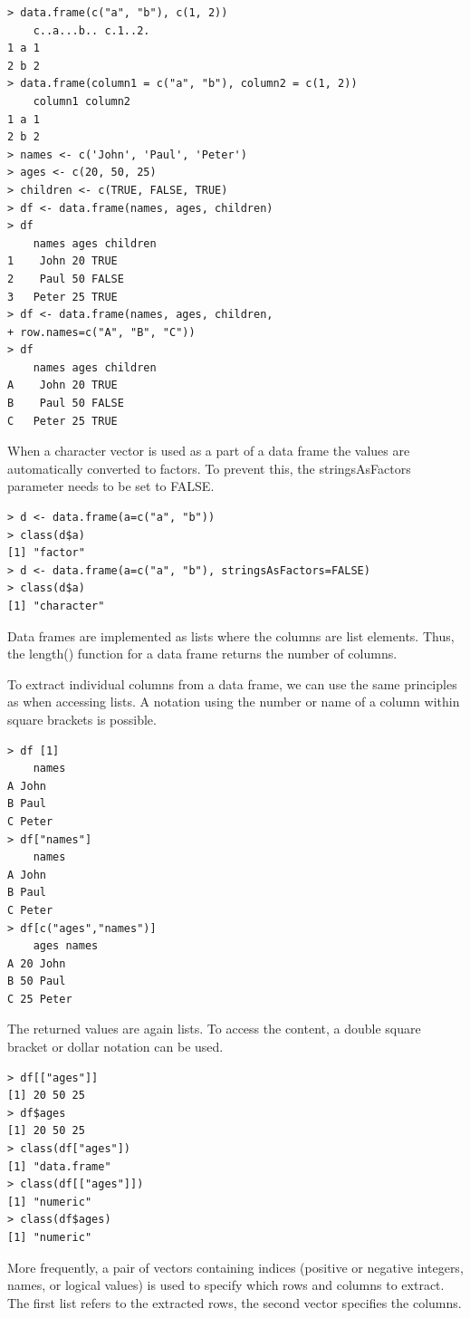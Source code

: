 \documentclass[11pt,openany,executivepaper]{book}
\begin{document}
\begin{verbatim}
> data.frame(c("a", "b"), c(1, 2))
    c..a...b.. c.1..2.
1 a 1
2 b 2
> data.frame(column1 = c("a", "b"), column2 = c(1, 2))
    column1 column2
1 a 1
2 b 2
> names <- c('John', 'Paul', 'Peter')
> ages <- c(20, 50, 25)
> children <- c(TRUE, FALSE, TRUE)
> df <- data.frame(names, ages, children)
> df
    names ages children
1    John 20 TRUE
2    Paul 50 FALSE
3   Peter 25 TRUE
> df <- data.frame(names, ages, children,
+ row.names=c("A", "B", "C"))
> df
    names ages children
A    John 20 TRUE
B    Paul 50 FALSE
C   Peter 25 TRUE
\end{verbatim}

When a character vector is used as a part of a data frame the values are automatically converted to factors. To prevent this, the stringsAsFactors parameter needs to be set to FALSE.

\begin{verbatim}
> d <- data.frame(a=c("a", "b"))
> class(d$a)
[1] "factor"
> d <- data.frame(a=c("a", "b"), stringsAsFactors=FALSE)
> class(d$a)
[1] "character"
\end{verbatim}

Data frames are implemented as lists where the columns are list elements. Thus, the length() function for a data frame returns the number of columns.

To extract individual columns from a data frame, we can use the same principles as when accessing lists. A notation using the number or name of a column within square brackets is possible.

\begin{verbatim}
> df [1]
    names
A John
B Paul
C Peter
> df["names"]
    names
A John
B Paul
C Peter
> df[c("ages","names")]
    ages names
A 20 John
B 50 Paul
C 25 Peter
\end{verbatim}

The returned values are again lists. To access the content, a double square bracket or dollar notation can be used.

\begin{verbatim}
> df[["ages"]]
[1] 20 50 25
> df$ages
[1] 20 50 25
> class(df["ages"])
[1] "data.frame"
> class(df[["ages"]])
[1] "numeric"
> class(df$ages)
[1] "numeric"
\end{verbatim}

More frequently, a pair of vectors containing indices (positive or negative integers, names, or logical values) is used to specify which rows and columns to extract. The first list refers to the extracted rows, the second vector specifies the columns.
\end{document}
